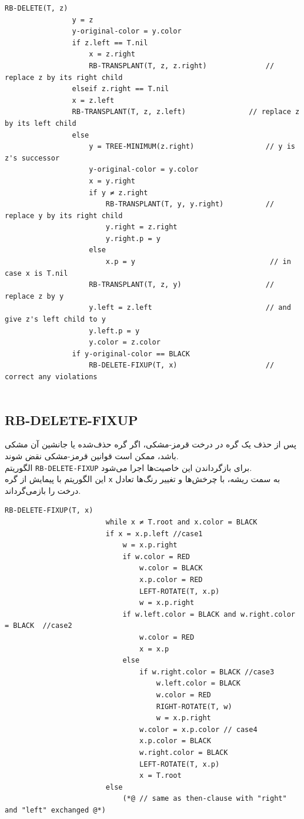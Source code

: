 \documentclass[a4paper,12pt]{article}
\begin{document}
	\begin{LTR}
		\begin{lstlisting}[caption={Red-Black Tree Deletion}, label={lst:rb-delete}]
			RB-DELETE(T, z)
				y = z
				y-original-color = y.color
				if z.left == T.nil
					x = z.right
					RB-TRANSPLANT(T, z, z.right)              // replace z by its right child
				elseif z.right == T.nil
				x = z.left
				RB-TRANSPLANT(T, z, z.left)               // replace z by its left child
				else
					y = TREE-MINIMUM(z.right)                 // y is z's successor
					y-original-color = y.color
					x = y.right
					if y ≠ z.right
						RB-TRANSPLANT(T, y, y.right)          // replace y by its right child
						y.right = z.right
						y.right.p = y
					else
						x.p = y                                // in case x is T.nil
					RB-TRANSPLANT(T, z, y)                    // replace z by y
					y.left = z.left                           // and give z's left child to y
					y.left.p = y
					y.color = z.color
				if y-original-color == BLACK
					RB-DELETE-FIXUP(T, x)                     // correct any violations
			
		\end{lstlisting}
	\end{LTR}
	
		\subsection{RB-DELETE-FIXUP }
		

			پس از حذف یک گره در درخت قرمز-مشکی، اگر گره حذف‌شده یا جانشین آن مشکی باشد، ممکن است قوانین قرمز-مشکی نقض شوند. \\
			الگوریتم \texttt{RB-DELETE-FIXUP} برای بازگرداندن این خاصیت‌ها اجرا می‌شود. \\
			این الگوریتم با پیمایش از گره \texttt{x} به سمت ریشه، با چرخش‌ها و تغییر رنگ‌ها تعادل درخت را بازمی‌گرداند.

		
			\begin{LTR}
				\begin{lstlisting}[caption={Red-Black Tree Deletion}, label={lst:rb-delete}]
					RB-DELETE-FIXUP(T, x)
						while x ≠ T.root and x.color = BLACK
						if x = x.p.left //case1
							w = x.p.right
							if w.color = RED
								w.color = BLACK
								x.p.color = RED
								LEFT-ROTATE(T, x.p)
								w = x.p.right
							if w.left.color = BLACK and w.right.color = BLACK  //case2
								w.color = RED
								x = x.p
							else
								if w.right.color = BLACK //case3
									w.left.color = BLACK
									w.color = RED
									RIGHT-ROTATE(T, w)
									w = x.p.right
								w.color = x.p.color // case4
								x.p.color = BLACK
								w.right.color = BLACK
								LEFT-ROTATE(T, x.p)
								x = T.root
						else 
							(*@ // same as then-clause with "right" and "left" exchanged @*)

				\end{lstlisting}
			\end{LTR}
			
\end{document}

